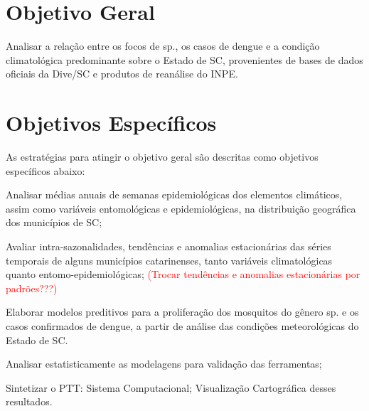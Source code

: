  \section{Objetivo Geral}
 Analisar a relação entre os focos de  sp., os casos de dengue e a condição climatológica predominante sobre o Estado de \acrlong{SC}, provenientes de bases de dados oficiais da \acrlong{Dive}/\acrshort{SC} e produtos de reanálise do \acrlong{INPE}.





 
\section{Objetivos Específicos}
As estratégias para atingir o objetivo geral são descritas como objetivos específicos abaixo:

\begin{alineas}
\item Analisar médias anuais de semanas epidemiológicas dos elementos climáticos, assim como variáveis entomológicas e epidemiológicas, na distribuição geográfica dos municípios de \acrlong{SC};
\item Avaliar intra-sazonalidades, tendências e anomalias estacionárias das séries temporais de alguns municípios catarinenses, tanto  variáveis climatológicas quanto entomo-epidemiológicas; \textcolor{red}{(Trocar tendências e anomalias estacionárias por padrões???)}
\item Elaborar modelos preditivos para a proliferação dos mosquitos do gênero  sp. e os casos confirmados de dengue, a partir de análise das condições meteorológicas do Estado de \acrlong{SC}.
\item Analisar estatisticamente as modelagens para validação das ferramentas;
\item Sintetizar o \acrfull{PTT}:
\subitem Sistema Computacional;
\subitem Visualização Cartográfica desses resultados.
\end{alineas}
